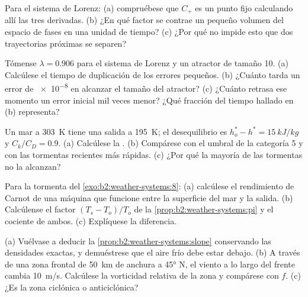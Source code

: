 \begin{exercise}[$\star\star$]\label{exo:b2:weather-systems:6}
Para el sistema de Lorenz: (a) compruébese que $C_+$ es un punto fijo calculando allí las tres derivadas.
(b) ¿En qué factor se contrae un pequeño volumen del espacio de fases en una unidad de tiempo? (c) ¿Por qué
no impide esto que dos trayectorias próximas se separen?
\end{exercise}

\begin{exercise}[$\star\star$]\label{exo:b2:weather-systems:7}
Tómense $\lambda = 0.906$ para el sistema de Lorenz y un atractor de tamaño 10. (a) Calcúlese el
tiempo de duplicación de los errores pequeños. (b) ¿Cuánto tarda un error de \num{e-8} en alcanzar el tamaño del
atractor? (c) ¿Cuánto retrasa ese momento un error inicial mil veces menor? ¿Qué
fracción del tiempo hallado en (b) representa?
\end{exercise}

\begin{exercise}[$\star\star$]\label{exo:b2:weather-systems:8}
Un mar a \qty{303}{K} tiene una salida a \qty{195}{K}; el desequilibrio es $h_o^* - h^* =
\qty{15}{kJ/kg}$ y $C_k/C_D = 0.9$. (a) Calcúlese la . (b) Compárese con
el umbral de la categoría 5 y con las tormentas recientes más rápidas. (c) ¿Por qué la mayoría de las tormentas no la
alcanzan?
\end{exercise}

\begin{exercise}[$\star\star$]\label{exo:b2:weather-systems:9}
Para la tormenta del \cref{exo:b2:weather-systems:8}: (a) calcúlese el rendimiento de Carnot de una máquina
que funcione entre la superficie del mar y la salida. (b) Calcúlense el factor $(T_s - T_o)/T_o$ de la
\cref{prop:b2:weather-systems:pi} y el cociente de ambos. (c) Explíquese la diferencia.
\end{exercise}

\begin{exercise}[$\star\star\star$]\label{exo:b2:weather-systems:10}
(a) Vuélvase a deducir la \cref{prop:b2:weather-systems:slope} conservando las densidades exactas, y demuéstrese que
el aire frío debe estar debajo. (b) A través de una zona frontal de \qty{50}{km} de anchura a \ang{45} N, el viento
a lo largo del frente cambia \qty{10}{m/s}. Calcúlese la vorticidad relativa de la zona y compárese
con $f$. (c) ¿Es la zona ciclónica o anticiclónica?
\end{exercise}

